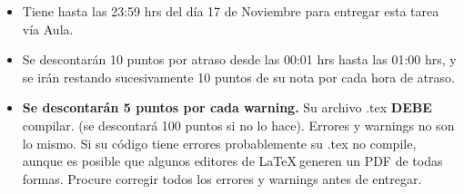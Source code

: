 \documentclass[letterpaper,10pt]{article}
\begin{document}
\begin{itemize}
    \item Tiene hasta las 23:59 hrs del día 17 de Noviembre para entregar esta tarea vía Aula.
    
    \item Se descontarán 10 puntos por atraso desde las 00:01 hrs hasta las 01:00 hrs, y se irán restando sucesivamente 10 puntos de su nota por cada hora de atraso.
    
    \item \textbf{Se descontarán 5 puntos por cada warning.} Su archivo .tex \textbf{DEBE} compilar. (se descontará 100 puntos si no lo hace). Errores y warnings no son lo mismo. Si su código tiene errores probablemente su .tex no compile, aunque es posible que algunos editores de \LaTeX $~$generen un PDF de todas formas. Procure corregir todos los errores y warnings antes de entregar.
    
    
\end{itemize}
\end{document}
